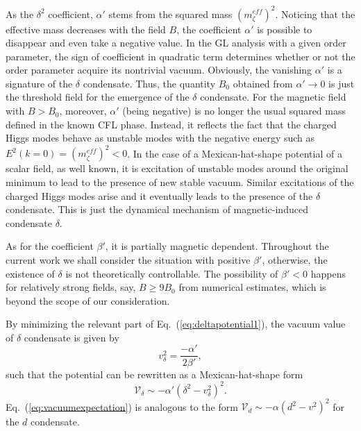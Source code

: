 \documentclass[prd, showpacs,nofootinbib,amsmath,amssymb]{revtex4}
\begin{document}
%

As the $\delta^2$ coefficient, $\alpha'$ stems from the squared mass $(m_\zeta^{eff})^2$. Noticing that the effective mass decreases with the field $B$, the coefficient $\alpha'$ is possible to disappear and even take a negative value. In the GL analysis with a given order parameter, the sign of coefficient in quadratic term
determines whether or not the order parameter acquire its nontrivial vacuum.
Obviously, the vanishing $\alpha'$ is a signature of the
$\delta$ condensate. Thus, the quantity $B_0$ obtained from $\alpha' \rightarrow 0$ is just the
threshold field for the emergence of the $\delta$ condensate.
For the magnetic field with $B > B_0$, moreover, $\alpha'$ (being negative) is no longer the usual squared mass defined in the known CFL phase. Instead, it reflects the fact that the charged Higgs modes behave as unstable modes
with the negative energy such as $E^2(k=0)=(m_\zeta^{eff})^2<0$. In the case of a Mexican-hat-shape potential of a scalar field, as well known, it is excitation of unstable modes around the original minimum to lead to the presence of new stable vacuum.  
Similar excitations of the charged Higgs modes arise and it eventually leads to the presence of the $\delta$ condensate.
This is just the dynamical mechanism of magnetic-induced condensate $\delta$.


As for the coefficient $\beta'$, it is partially magnetic dependent. Throughout the current work we
shall consider the situation with positive $\beta'$, otherwise, the existence of $\delta$ is not
theoretically controllable. The possibility of $\beta'< 0$ happens for relatively strong fields, say,
$B \geq 9 B_0$ from numerical estimates, which is beyond the scope of our consideration.


By minimizing the relevant part of Eq.~(\ref{eq:deltapotential1}), the vacuum value of $\delta$ condensate is given by
\begin{equation}
\label{eq:vacuumexpectation}
v_\delta^2 = \frac{- \alpha'} {2\beta'},
\end{equation}
such that the potential can be rewritten as a Mexican-hat-shape form
\begin{equation}
\label{eq:deltapotential}
\mathcal{V}_\delta \sim - \alpha'(\delta^2 - v_\delta^2)^2.
\end{equation}
Eq.~(\ref{eq:vacuumexpectation}) is analogous to the form $\mathcal{V}_d \sim - \alpha (d^2 - v^2)^2$
for the $d$ condensate.
\end{document}
